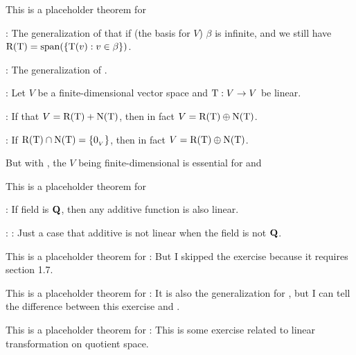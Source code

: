 \begin{additional theorem} \label{athm 2.10}
This is a placeholder theorem for

 : The generalization of  that if (the basis for \(V\)) \(\beta\) is infinite, and we still have \(\mathrm{R(T)} = \operatorname{span}(\{ \mathrm{T}(v) : v \in \beta \})\).

 : The generalization of .
\end{additional theorem}

\begin{additional theorem} \label{athm 2.11}

:
Let \(V\) be a finite-dimensional vector space and \(\mathrm{T} : V \to V\) be linear.

: If that \(V = \mathrm{R(T)} + \mathrm{N(T)}\), then in fact
\(V = \mathrm{R(T)} \oplus \mathrm{N(T)}\).

: If \(\mathrm{R(T)} \cap \mathrm{N(T)} = \{ 0_{_V} \}\), then in fact \(V = \mathrm{R(T)} \oplus \mathrm{N(T)}\).

 But with , the \(V\) being finite-dimensional is essential for  and 
\end{additional theorem}

\begin{additional theorem} \label{athm 2.12}
This is a placeholder theorem for

 : If field is \(\mathbf{Q}\), then any additive function is also linear.

: : Just a case that additive is not linear when the field is not \(\mathbf{Q}\).
\end{additional theorem}

\begin{additional theorem} \label{athm 2.13}
This is a placeholder theorem for :
But I skipped the exercise because it requires section 1.7.
\end{additional theorem}

\begin{additional theorem} \label{athm 2.14}
This is a placeholder theorem for :
It is also the generalization for , but I can tell the difference between this exercise and .
\end{additional theorem}

\begin{additional theorem} \label{athm 2.15}
This is a placeholder theorem for :
This is some exercise related to linear transformation on quotient space.
\end{additional theorem}
